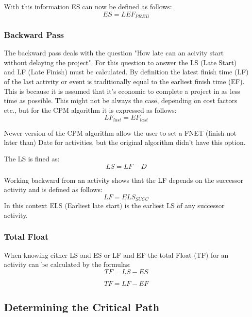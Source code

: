 With this information ES can now be defined as follows:
\begin{equation}
ES = LEF_{PRED}
\end{equation}

\subsubsection{Backward Pass}
The backward pass deals with the question "How late can an acivity start without delaying the project".
For this question to answer the LS (Late Start) and LF (Late Finish) must be calculated.
By definition the latest finish time (LF) of the last activity or event is traditionally equal to the earliest finish time (EF). This is because it is assumed that it's economic to complete a project in as less time as possible. This might not be always the case, depending on cost factors etc., but for the CPM algorithm it is expressed as follows:
\begin{equation}
LF_{last} = EF_{last}
\end{equation}
 
Newer version of the CPM algorithm allow the user to set a FNET (finish not later than) Date for activities, but the original algorithm didn't have this option.
 
 
The LS is fined as:
\begin{equation}
LS = LF - D
\end{equation}
 
Working backward from an activity shows that the LF depends on the successor activity and is defined as follows:
\begin{equation}
LF = ELS_{SUCC}
\end{equation}
In this context ELS (Earliest late start) is the earliest LS of any successor activity.
 
\subsubsection{Total Float}
 
 When knowing either LS and ES  or LF and EF the total Float (TF) for an activity can be calculated by the formulas:
\begin{equation}
	TF = LS - ES
\end{equation}	

\begin{equation}
TF = LF - EF
\end{equation} 

\subsection{Determining the Critical Path} \label{determine_crit_path}

